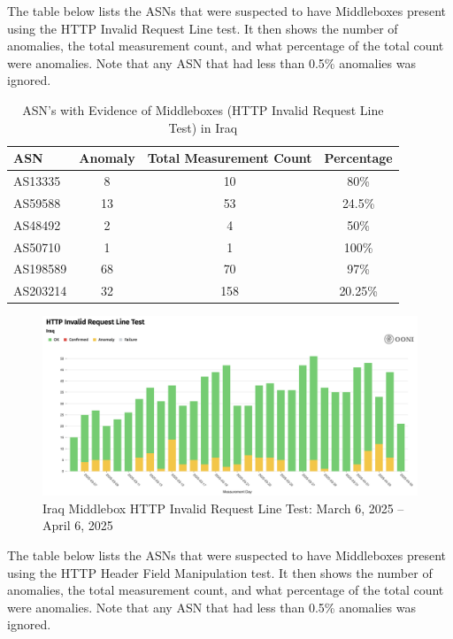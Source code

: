 The table below lists the ASNs that were suspected to have Middleboxes present using the HTTP Invalid Request Line test. It then shows the number of anomalies, the total measurement count, and what percentage of the total count were anomalies. Note that any ASN that had less than 0.5\% anomalies was ignored.

\begin{table}[H]
\centering
\caption{ASN's with Evidence of Middleboxes (HTTP Invalid Request Line Test) in Iraq}
\begin{tabular}{lccc}
\toprule
\textbf{ASN} & \textbf{Anomaly} & \textbf{Total Measurement Count} & \textbf{Percentage} \\
\midrule
AS13335   & 8 & 10 & 80\% \\
AS59588   & 13 & 53 & 24.5\% \\
AS48492   & 2 & 4 & 50\% \\
AS50710   & 1 & 1 & 100\% \\
AS198589  & 68 & 70 & 97\% \\
AS203214  & 32 & 158 & 20.25\% \\
\bottomrule
\end{tabular}
\label{tab:category_block}
\end{table}

\begin{figure}[H]
    \centering
    \includegraphics[width=\textwidth]{Griff/TCD SCSS CAPSTONE/Results/IraqMiddleboxHTTPInvalidTest.png}
    \caption{Iraq Middlebox HTTP Invalid Request Line Test: March 6, 2025 -- April 6, 2025}
    \label{fig:iraq-middlebox-invalid-request}
\end{figure}

The table below lists the ASNs that were suspected to have Middleboxes present using the HTTP Header Field Manipulation test. It then shows the number of anomalies, the total measurement count, and what percentage of the total count were anomalies. Note that any ASN that had less than 0.5\% anomalies was ignored.

